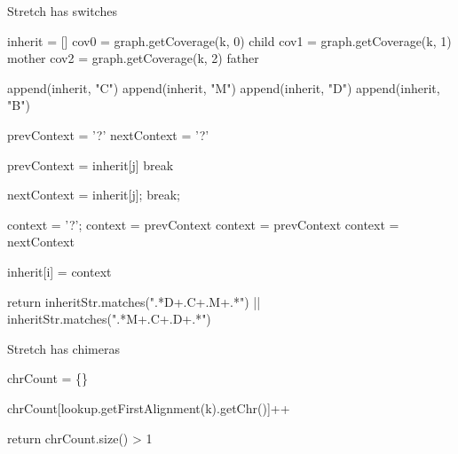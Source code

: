 \begin{algorithm}
\caption{Stretch has switches}
\label{alg:hasSwitches}
\begin{algorithmic}[1]
    \State inherit = []
        \State cov0 = graph.getCoverage(k, 0) \Comment child
        \State cov1 = graph.getCoverage(k, 1) \Comment mother
        \State cov2 = graph.getCoverage(k, 2) \Comment father

            \State append(inherit, "C")
            \State append(inherit, "M")
            \State append(inherit, "D")
            \State append(inherit, "B")
        \EndIf
    \EndFor

            \State prevContext = '?'
            \State nextContext = '?'

                    \State prevContext = inherit[j]
                    \State break
                \EndIf
            \EndFor

                    \State nextContext = inherit[j];
                    \State break;
                \EndIf
            \EndFor

            \State context = '?';
                \State context = prevContext
                    \State context = prevContext
                \Else
                    \State context = nextContext
                \EndIf
            \EndIf

            \State inherit[i] = context
        \EndFor
    \EndFor

    \State return inheritStr.matches(".*D+.C+.M+.*") || inheritStr.matches(".*M+.C+.D+.*")
\EndFunction
\end{algorithmic}
\end{algorithm}

\begin{algorithm}
\caption{Stretch has chimeras}
\label{alg:hasChimeras}
\begin{algorithmic}[1]
    \State chrCount = \{\}

            \State chrCount[lookup.getFirstAlignment(k).getChr()]++
        \EndIf
    \EndFor

    \State return chrCount.size() > 1
\EndFunction
\end{algorithmic}
\end{algorithm}

